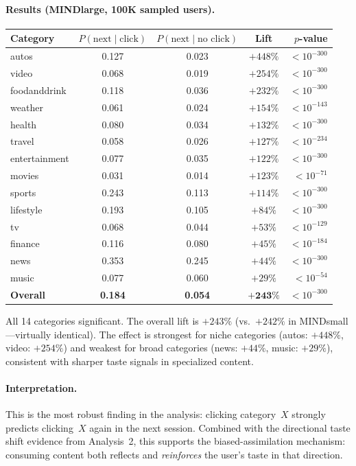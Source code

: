 \documentclass[11pt]{article}
\begin{document}
\paragraph{Results (MINDlarge, 100K sampled users).}
\begin{center}
\begin{tabular}{lcccr}
\toprule
Category & $P(\text{next} \mid \text{click})$ & $P(\text{next} \mid \text{no click})$ & Lift & $p$-value \\
\midrule
autos & 0.127 & 0.023 & $+448\%$ & $< 10^{-300}$ \\
video & 0.068 & 0.019 & $+254\%$ & $< 10^{-300}$ \\
foodanddrink & 0.118 & 0.036 & $+232\%$ & $< 10^{-300}$ \\
weather & 0.061 & 0.024 & $+154\%$ & $< 10^{-143}$ \\
health & 0.080 & 0.034 & $+132\%$ & $< 10^{-300}$ \\
travel & 0.058 & 0.026 & $+127\%$ & $< 10^{-234}$ \\
entertainment & 0.077 & 0.035 & $+122\%$ & $< 10^{-300}$ \\
movies & 0.031 & 0.014 & $+123\%$ & $< 10^{-71}$ \\
sports & 0.243 & 0.113 & $+114\%$ & $< 10^{-300}$ \\
lifestyle & 0.193 & 0.105 & $+84\%$ & $< 10^{-300}$ \\
tv & 0.068 & 0.044 & $+53\%$ & $< 10^{-129}$ \\
finance & 0.116 & 0.080 & $+45\%$ & $< 10^{-184}$ \\
news & 0.353 & 0.245 & $+44\%$ & $< 10^{-300}$ \\
music & 0.077 & 0.060 & $+29\%$ & $< 10^{-54}$ \\
\midrule
\textbf{Overall} & \textbf{0.184} & \textbf{0.054} & $\boldsymbol{+243\%}$ & $< 10^{-300}$ \\
\bottomrule
\end{tabular}
\end{center}

All 14 categories significant. The overall lift is $+243\%$ (vs.\ $+242\%$ in MINDsmall---virtually identical). The effect is strongest for niche categories (autos: $+448\%$, video: $+254\%$) and weakest for broad categories (news: $+44\%$, music: $+29\%$), consistent with sharper taste signals in specialized content.

\paragraph{Interpretation.} This is the most robust finding in the analysis: clicking category~$X$ strongly predicts clicking~$X$ again in the next session. Combined with the directional taste shift evidence from Analysis~2, this supports the biased-assimilation mechanism: consuming content both reflects and \emph{reinforces} the user's taste in that direction.
\end{document}
